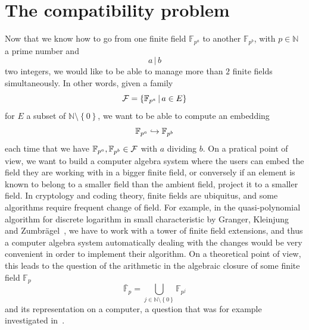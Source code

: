 \clearpage
\section{The compatibility problem}
\label{sec:compatibility-problem}

Now that we know how to go from one finite field $\mathbb{F}_{p^a}$ to another
$\mathbb{F}_{p^b}$, with $p\in\mathbb{N}$ a prime number and
\[
  a\,|\,b
\]
two integers, we would like to be able to manage more than $2$ finite fields
simultaneously. In other words, given a family
\[
  \mathcal{F}=\left\{ \mathbb{F}_{p^{a}}\,|\,a\in E \right\}
\]
for $E$ a subset of $\mathbb{N}\setminus\left\{ 0 \right\}$,
we want to be able to compute an embedding
\[
  \mathbb{F}_{p^a}\hookrightarrow\mathbb{F}_{p^b}
\]
each time that we have $\mathbb{F}_{p^a}, \mathbb{F}_{p^b}\in\mathcal{F}$ with $a$
dividing $b$. On a pratical point of view, we want to build a computer algebra
system where the users can embed the field they are working with in a bigger
finite field, or conversely if an element is known to belong to a smaller field
than the ambient field, project it to a smaller field. In cryptology and coding
theory, finite fields are ubiquitus, and some algorithms require frequent change
of field. For example, in the
quasi-polynomial algorithm for discrete logarithm in small characteristic by
Granger, Kleinjung and Zumbrägel~\cite{GKZ14}, we have to work with a tower of
finite field extensions, and thus a computer algebra system automatically
dealing with the changes would be very convenient in order to implement their
algorithm. On a theoretical point of view, this leads to the question of the
arithmetic in the algebraic closure of some finite field $\mathbb{F}_p$
\[
  \bar{\mathbb{F}}_p=\bigcup_{j\in\mathbb{N}\setminus\left\{ 0
  \right\}}\mathbb{F}_{p^j}
\]
and its representation on a computer, a question that was for example
investigated in~\cite{DDS14}. 

